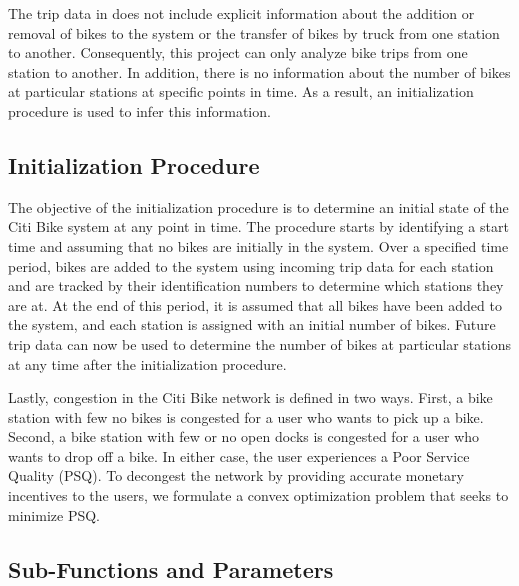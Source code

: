 \documentclass[times, 10pt,twocolumn]{article}
\begin{document}
The trip data in \cite{dataset} does not include explicit information about the addition or removal of bikes to the system or the transfer of bikes by truck from one station to another. Consequently, this project can only analyze bike trips from one station to another. In addition, there is no information about the number of bikes at particular stations at specific points in time. As a result, an initialization procedure is used to infer this information.

\subsection{Initialization Procedure}
The objective of the initialization procedure is to determine an initial state of the Citi Bike system at any point in time. The procedure starts by identifying a start time and assuming that no bikes are initially in the system. Over a specified time period, bikes are added to the system using incoming trip data for each station and are tracked by their identification numbers to determine which stations they are at. At the end of this period, it is assumed that all bikes have been added to the system, and each station is assigned with an initial number of bikes. Future trip data can now be used to determine the number of bikes at particular stations at any time after the initialization procedure.

Lastly, congestion in the Citi Bike network is defined in two ways. First, a bike station with few no bikes is congested for a user who wants to pick up a bike. Second, a bike station with few or no open docks is congested for a user who wants to drop off a bike. In either case, the user experiences a Poor Service Quality (PSQ). To decongest the network by providing accurate monetary incentives to the users, we formulate a convex optimization problem that seeks to minimize PSQ.

\subsection{Sub-Functions and Parameters}
\end{document}
